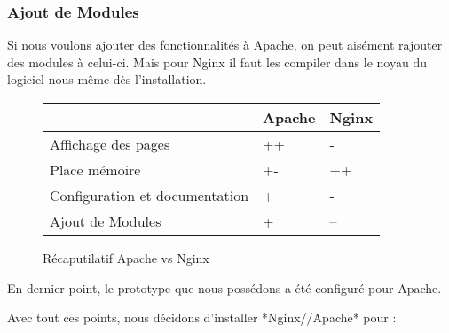 \subsubsection{Ajout de Modules}
Si nous voulons ajouter des fonctionnalités à Apache, on peut aisément rajouter des modules à celui-ci. Mais pour Nginx il faut les compiler dans le noyau du logiciel nous même dès l'installation.

\begin{figure}[h]
\begin{center}
\begin{tabular}{|m{175pt}|m{50pt}|m{50pt}|}
	\hline
	\null & \textbf{Apache} & \textbf{Nginx} \\
	\hline
	Affichage des pages & ++ & -\\
	\hline
	Place mémoire & +- & ++\\
	\hline
	Configuration et documentation & + & - \\
	\hline
	Ajout de Modules & + & -- \\
	\hline
\end{tabular} \vspace*{5mm}
\caption{Récaputilatif Apache vs Nginx}
\end{center}
\end{figure}

En dernier point, le prototype que nous possédons a été configuré pour Apache.

Avec tout ces points, nous décidons d'installer *Nginx//Apache* pour :

